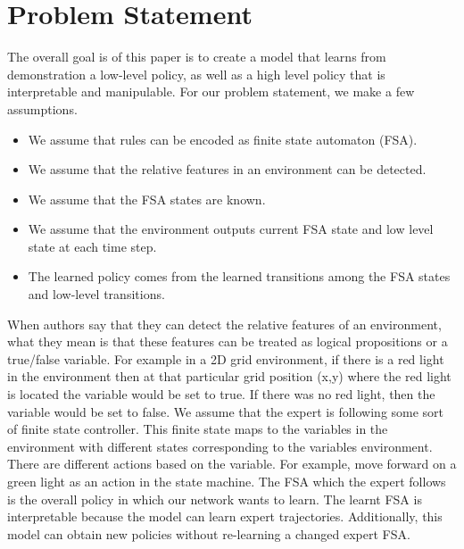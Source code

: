 \documentclass[letterpaper, 10 pt, conference]{ieeeconf}  %
\begin{document}
\section{Problem Statement}
The overall goal is of this paper is to create a model that learns from demonstration a low-level policy, as well as a high level policy that is interpretable and manipulable. For our problem statement, we make a few assumptions. 
\begin{itemize}
  \item We assume that rules can be encoded as finite state automaton (FSA). 
  \item We assume that the relative features in an environment can be detected.
  \item We assume that the FSA states are known.
  \item We assume that the environment outputs current FSA state and low level state at each time step.
  \item The learned policy comes from the learned transitions among the FSA states and low-level transitions.
\end{itemize}

When authors say that they can detect the relative features of an environment, what they mean is that these features can be treated as logical propositions or a true/false variable. For example in a 2D grid environment, if there is a red light in the environment then at that particular grid position (x,y) where the red light is located the variable would be set to true. If there was no red light, then the variable would be set to false.
\newline
\indent We assume that the expert is following some sort of finite state controller. This finite state maps to the variables in the environment with different states corresponding to the variables environment. There are different actions based on the variable. For example, move forward on a green light as an action in the state machine. The FSA which the expert follows is the overall policy in which our network wants to learn. The learnt FSA is interpretable because the model can learn expert trajectories. Additionally, this model can obtain new policies without re-learning a changed expert FSA.
\end{document}
